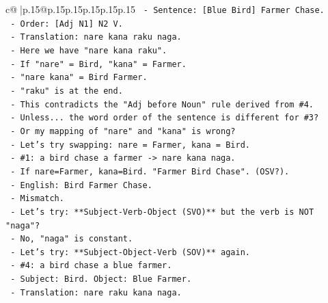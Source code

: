 \documentclass{article}
\begin{document}
{\begin{supertabular}{c@{$\;$}|p{.15\linewidth}@{}p{.15\linewidth}p{.15\linewidth}p{.15\linewidth}p{.15\linewidth}p{.15\linewidth}}
{{{\texttt{                               {-} Sentence: {[}Blue Bird{]} Farmer Chase.} \\
\texttt{                               {-} Order: {[}Adj N1{]} N2 V.} \\
\texttt{                               {-} Translation: nare kana raku naga.} \\
\texttt{                               {-} Here we have "nare kana raku".} \\
\texttt{                               {-} If "nare" = Bird, "kana" = Farmer.} \\
\texttt{                               {-} "nare kana" = Bird Farmer.} \\
\texttt{                               {-} "raku" is at the end.} \\
\texttt{                               {-} This contradicts the "Adj before Noun" rule derived from \#4.} \\
\texttt{                               {-} Unless... the word order of the sentence is different for \#3?} \\
\texttt{                               {-} Or my mapping of "nare" and "kana" is wrong?} \\
\texttt{                               {-} Let's try swapping: nare = Farmer, kana = Bird.} \\
\texttt{                                 {-} \#1: a bird chase a farmer {-}> nare kana naga.} \\
\texttt{                                   {-} If nare=Farmer, kana=Bird. "Farmer Bird Chase". (OSV?).} \\
\texttt{                                   {-} English: Bird Farmer Chase.} \\
\texttt{                                   {-} Mismatch.} \\
\texttt{                               {-} Let's try: **Subject{-}Verb{-}Object (SVO)** but the verb is NOT "naga"?} \\
\texttt{                                 {-} No, "naga" is constant.} \\
\texttt{                               {-} Let's try: **Subject{-}Object{-}Verb (SOV)** again.} \\
\texttt{                                 {-} \#4: a bird chase a blue farmer.} \\
\texttt{                                   {-} Subject: Bird. Object: Blue Farmer.} \\
\texttt{                                   {-} Translation: nare raku kana naga.} \\
}}}
\end{supertabular}}
\end{document}
